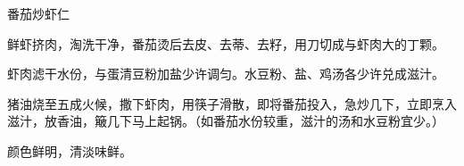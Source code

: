 %
%
%
%
%
%
%
\begin{recipe}{番茄炒虾仁}

\ingredients


\preparation

\step 鲜虾挤肉，淘洗干净，番茄烫后去皮、去蒂、去籽，用刀切成与虾肉大的丁颗。

\step 虾肉滤干水份，与蛋清豆粉加盐少许调匀。水豆粉、盐、鸡汤各少许兑成滋汁。

\step 猪油烧至五成火候，撒下虾肉，用筷子滑散，即将番茄投入，急炒几下，立即烹入
滋汁，放香油，簸几下马上起锅。（如番茄水份较重，滋汁的汤和水豆粉宜少。）

\features

颜色鲜明，清淡味鲜。

\end{recipe}

